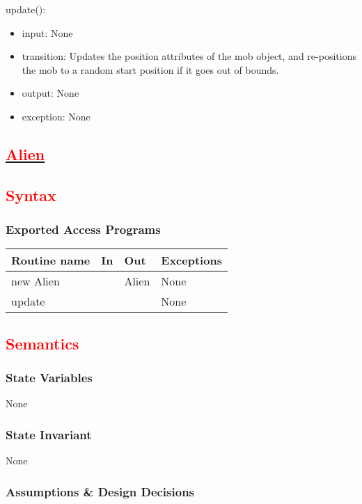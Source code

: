 \documentclass[12pt, titlepage]{article}
\begin{document}
\noindent update():
\begin{itemize}
\item input: None
\item transition: Updates the position attributes of the mob object, and re-positions the mob to a random start position if it goes out of bounds. 
\item output: None
\item exception: None
\end{itemize}

\subsection* {\underline{\textcolor{red}{Alien}}}
\subsection* {\textcolor{red}{Syntax}}

\subsubsection* {Exported Access Programs}

\begin{tabular}{| l | l | l | p{5cm} |}
\hline
\textbf{Routine name} & \textbf{In} & \textbf{Out} & \textbf{Exceptions}\\
\hline
new Alien & & Alien & None\\
\hline
update & & & None\\
\hline
\end{tabular}

\subsection* {\textcolor{red}{Semantics}}

\subsubsection* {State Variables}

None

\subsubsection* {State Invariant}

None

\subsubsection* {Assumptions \& Design Decisions}
\end{document}
